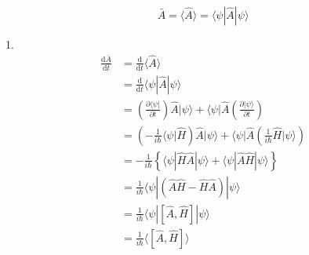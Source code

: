 \begin{equation}
    \bar{A}=\langle \hat{A}\rangle =\langle \psi |\hat{A}|\psi \rangle 
\end{equation}

1.
\begin{equation}
    \begin{aligned}
        \frac{\mathrm{d}\bar{A}}{\mathrm{d}t}&=\frac{\mathrm{d}}{\mathrm{d}t}\langle \hat{A}\rangle 
\\
&=\frac{\mathrm{d}}{\mathrm{d}t}\langle \psi |\hat{A}|\psi \rangle 
\\
&=\left( \frac{\partial \langle \psi |}{\partial t} \right) \hat{A}|\psi \rangle +\langle \psi |\hat{A}\left( \frac{\partial |\psi \rangle}{\partial t} \right) 
\\
&=\left( -\frac{1}{i\hbar}\langle \psi |\hat{H} \right) \hat{A}|\psi \rangle +\langle \psi |\hat{A}\left( \frac{1}{i\hbar}\hat{H}|\psi \rangle \right) 
\\
&=-\frac{1}{i\hbar}\left\{ \langle \psi |\hat{H}\hat{A}|\psi \rangle +\langle \psi |\hat{A}\hat{H}|\psi \rangle \right\} 
\\
&=\frac{1}{i\hbar}\langle \psi |\left( \hat{A}\hat{H}-\hat{H}\hat{A} \right) |\psi \rangle 
\\
&=\frac{1}{i\hbar}\langle \psi |[\hat{A},\hat{H}]|\psi \rangle 
\\
&=\frac{1}{i\hbar}\langle [\hat{A},\hat{H}]\rangle 
    \end{aligned}
\end{equation}


